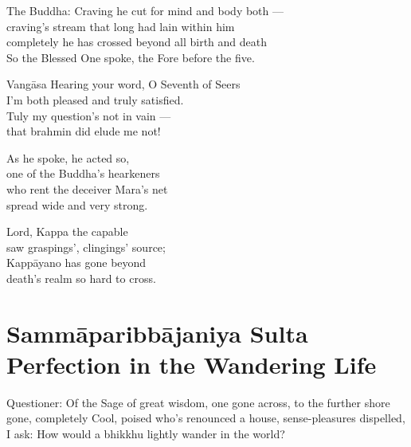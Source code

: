 \begin{MyDescription}{The Buddha:}
Craving he cut for mind and body both —\\
craving's stream that long had lain within him\\
completely he has crossed beyond all birth and death\\
So the Blessed One spoke, the Fore before the ﬁve.
\end{MyDescription}


\begin{MyDescription}{Vang\=asa}
Hearing your word, O Seventh of Seers\\
I'm both pleased and truly satisfied.\\
Tuly my question's not in vain —\\
that brahmin did elude me not!
\end{MyDescription}

\begin{MyDescription}{}
As he spoke, he acted so,\\
one of the Buddha's hearkeners\\
who rent the deceiver Mara's net\\
spread wide and very strong.
\end{MyDescription}

\begin{MyDescription}{}
Lord, Kappa the capable\\
saw graspings', clingings' source;\\
Kapp\=ayano has gone beyond\\
death's realm so hard to cross.
\end{MyDescription}
\begin{MyDescription}[(Sn. 343-358)]{}
\end{MyDescription}

\chapter{Samm\=aparibb\=ajaniya Sulta\\ Perfection in the Wandering Life}

\begin{MyDescription}{Questioner:}
Of the Sage of great wisdom, one gone across,
to the further shore gone, completely Cool, poised
who's renounced a house, sense-pleasures dispelled,
I ask: How would a bhikkhu lightly wander in the world?
\end{MyDescription}

